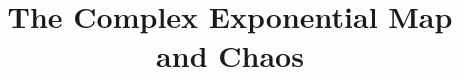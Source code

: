 \documentclass[mat1]{fmfdelo}
\title{The Complex Exponential Map and Chaos}
\begin{document}
\graphicspath{ {./slike/} }








\end{document}
